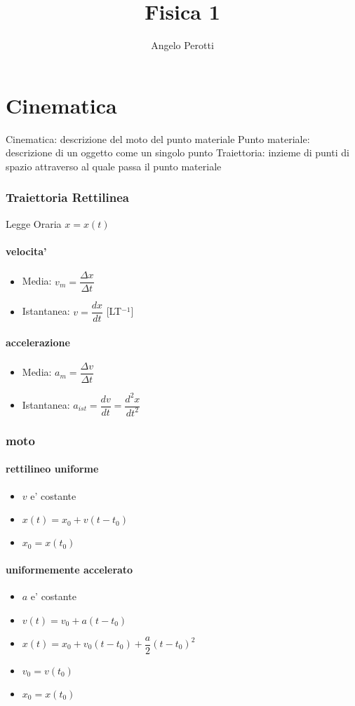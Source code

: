 \documentclass{book}
\title{Fisica 1}
\author{Angelo Perotti}
\begin{document}
\maketitle
\chapter{Cinematica}
Cinematica: descrizione del moto del punto materiale
Punto materiale: descrizione di un oggetto come un singolo punto
Traiettoria: inzieme di punti di spazio attraverso al quale passa il punto materiale

\subsection{Traiettoria Rettilinea}
 Legge Oraria \space $x=x(t)$
\subsubsection{velocita'}
\begin{itemize}
    \item Media: $v_m=\dfrac{\Delta x}{\Delta t}$
    \item Istantanea: $v=\dfrac{dx}{dt}$
        [LT$^{-1}$]
\end{itemize}
\subsubsection{accelerazione}
\begin{itemize}
    \item Media: $a_m=\dfrac{\Delta v}{\Delta t}$
    \item Istantanea: $a_{ist}=\dfrac{dv}{dt}=\dfrac{d^2x}{dt^2}$
\end{itemize}
\subsection{moto}
\subsubsection{rettilineo uniforme}
\begin{itemize}
    \item $v$ e' costante
    \item $x(t)=x_0+v(t-t_0)$
    \item $x_0=x(t_0)$
\end{itemize}
\subsubsection{uniformemente accelerato}
\begin{itemize}
    \item $a$ e' costante
    \item $v(t)=v_0+a(t-t_0)$
    \item $x(t)=x_0+v_0(t-t_0)+\dfrac{a}{2}(t-t_0)^2$
    \item $v_0=v(t_0)$
    \item $x_0=x(t_0)$
\end{itemize}
\end{document}
